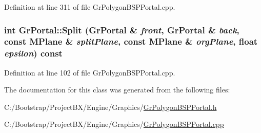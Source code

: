 Definition at line 311 of file GrPolygonBSPPortal.cpp.\hypertarget{class_gr_portal_c9be0015f4bf3300dd4e1dc7e7cbf2a0}{
\subsubsection[{Split}]{\setlength{\rightskip}{0pt plus 5cm}int GrPortal::Split ({\bf GrPortal} \& {\em front}, \/  {\bf GrPortal} \& {\em back}, \/  const {\bf MPlane} \& {\em splitPlane}, \/  const {\bf MPlane} \& {\em orgPlane}, \/  float {\em epsilon}) const}}
\label{class_gr_portal_c9be0015f4bf3300dd4e1dc7e7cbf2a0}




Definition at line 102 of file GrPolygonBSPPortal.cpp.

The documentation for this class was generated from the following files:\begin{CompactItemize}
\item 
C:/Bootstrap/ProjectBX/Engine/Graphics/\hyperlink{_gr_polygon_b_s_p_portal_8h}{GrPolygonBSPPortal.h}\item 
C:/Bootstrap/ProjectBX/Engine/Graphics/\hyperlink{_gr_polygon_b_s_p_portal_8cpp}{GrPolygonBSPPortal.cpp}\end{CompactItemize}
